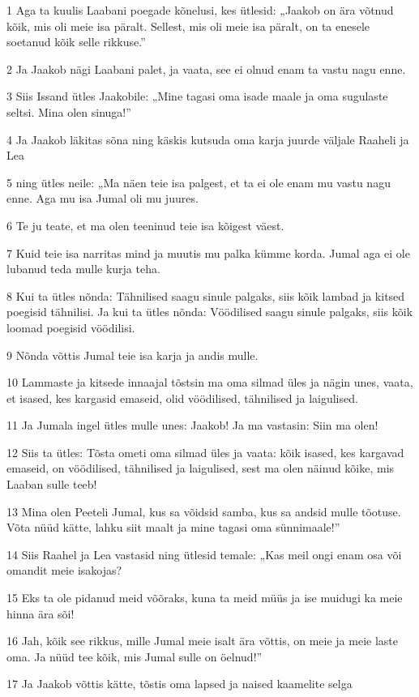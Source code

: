 \par 1 Aga ta kuulis Laabani poegade kõnelusi, kes ütlesid: „Jaakob on ära võtnud kõik, mis oli meie isa päralt. Sellest, mis oli meie isa päralt, on ta enesele soetanud kõik selle rikkuse.”
\par 2 Ja Jaakob nägi Laabani palet, ja vaata, see ei olnud enam ta vastu nagu enne.
\par 3 Siis Issand ütles Jaakobile: „Mine tagasi oma isade maale ja oma sugulaste seltsi. Mina olen sinuga!”
\par 4 Ja Jaakob läkitas sõna ning käskis kutsuda oma karja juurde väljale Raaheli ja Lea
\par 5 ning ütles neile: „Ma näen teie isa palgest, et ta ei ole enam mu vastu nagu enne. Aga mu isa Jumal oli mu juures.
\par 6 Te ju teate, et ma olen teeninud teie isa kõigest väest.
\par 7 Kuid teie isa narritas mind ja muutis mu palka kümme korda. Jumal aga ei ole lubanud teda mulle kurja teha.
\par 8 Kui ta ütles nõnda: Tähnilised saagu sinule palgaks, siis kõik lambad ja kitsed poegisid tähnilisi. Ja kui ta ütles nõnda: Vöödilised saagu sinule palgaks, siis kõik loomad poegisid vöödilisi.
\par 9 Nõnda võttis Jumal teie isa karja ja andis mulle.
\par 10 Lammaste ja kitsede innaajal tõstsin ma oma silmad üles ja nägin unes, vaata, et isased, kes kargasid emaseid, olid vöödilised, tähnilised ja laigulised.
\par 11 Ja Jumala ingel ütles mulle unes: Jaakob! Ja ma vastasin: Siin ma olen!
\par 12 Siis ta ütles: Tõsta ometi oma silmad üles ja vaata: kõik isased, kes kargavad emaseid, on vöödilised, tähnilised ja laigulised, sest ma olen näinud kõike, mis Laaban sulle teeb!
\par 13 Mina olen Peeteli Jumal, kus sa võidsid samba, kus sa andsid mulle tõotuse. Võta nüüd kätte, lahku siit maalt ja mine tagasi oma sünnimaale!”
\par 14 Siis Raahel ja Lea vastasid ning ütlesid temale: „Kas meil ongi enam osa või omandit meie isakojas?
\par 15 Eks ta ole pidanud meid võõraks, kuna ta meid müüs ja ise muidugi ka meie hinna ära sõi!
\par 16 Jah, kõik see rikkus, mille Jumal meie isalt ära võttis, on meie ja meie laste oma. Ja nüüd tee kõik, mis Jumal sulle on öelnud!”
\par 17 Ja Jaakob võttis kätte, tõstis oma lapsed ja naised kaamelite selga
